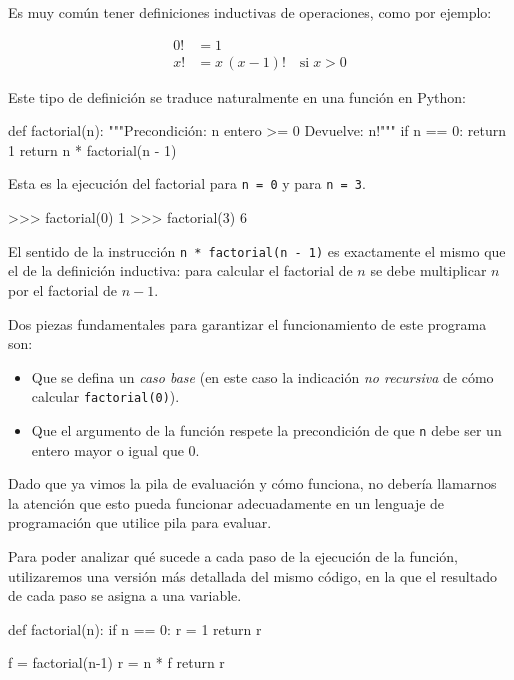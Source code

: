 Es muy común tener definiciones inductivas de operaciones, como por ejemplo:

\begin{align*}
0! &= 1 \\
x! &= x \, (x-1)! \quad \text{si}\; x>0
\end{align*}

Este tipo de definición se traduce naturalmente en una función en Python:

\begin{codigo-python-sn}
def factorial(n):
    """Precondición: n entero >= 0
       Devuelve: n!"""
    if n == 0:
        return 1
    return n * factorial(n - 1)
\end{codigo-python-sn}

Esta es la ejecución del factorial para \lstinline!n = 0! y para
\lstinline!n = 3!.

\begin{codigo-python-sn}
>>> factorial(0)
1
>>> factorial(3)
6
\end{codigo-python-sn}

El sentido de la instrucción
\lstinline|n * factorial(n - 1)| es exactamente el mismo que el de la
definición inductiva: para calcular el factorial de $n$ se debe multiplicar
$n$ por el factorial de $n-1$.

Dos piezas fundamentales para garantizar el funcionamiento de este programa
son:

\begin{itemize}
\item Que se defina un \emph{caso base} (en este caso la indicación \emph{no
recursiva} de cómo calcular \lstinline|factorial(0)|).

\item Que el argumento de la función respete la precondición
de que \lstinline!n! debe ser un entero mayor o igual que 0.
\end{itemize}

Dado que ya vimos la pila de evaluación y cómo funciona, no debería
llamarnos la atención que esto pueda funcionar adecuadamente en un lenguaje
de programación que utilice pila para evaluar.

Para poder analizar qué sucede a cada paso de la ejecución de la función,
utilizaremos una versión más detallada del mismo código, en la que el resultado
de cada paso se asigna a una variable.

\begin{codigo-python-sn}
def factorial(n):
    if n == 0:
        r = 1
        return r

    f = factorial(n-1)
    r = n * f
    return r
\end{codigo-python-sn}

